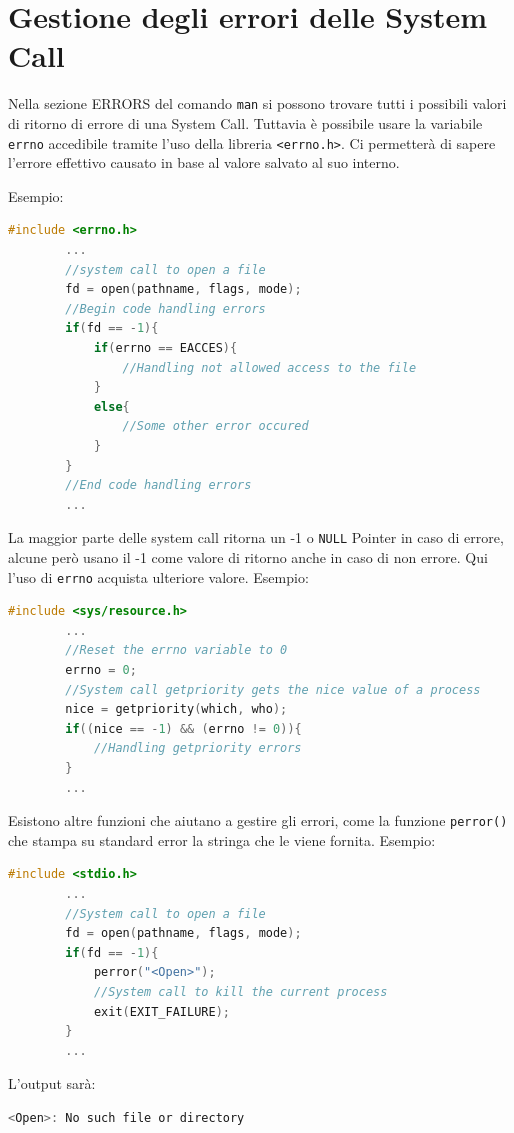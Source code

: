 \documentclass[a4paper, 12pt]{book}
\begin{document}
    \section{Gestione degli errori delle System Call}

    Nella sezione ERRORS del comando \verb|man| si possono trovare
    tutti i possibili valori di ritorno di errore di una 
    System Call. Tuttavia è possibile usare la variabile 
    \verb|errno| accedibile tramite l'uso della libreria
    \verb|<errno.h>|. Ci permetterà di sapere l'errore 
    effettivo causato in base al valore salvato al suo 
    interno.

    Esempio:
    \begin{lstlisting}[language=C]
        #include <errno.h>
        ...
        //system call to open a file
        fd = open(pathname, flags, mode);
        //Begin code handling errors
        if(fd == -1){
            if(errno == EACCES){
                //Handling not allowed access to the file
            }
            else{
                //Some other error occured
            }
        }
        //End code handling errors
        ...
    \end{lstlisting}
    La maggior parte delle system call ritorna un -1 
    o \verb|NULL| Pointer in caso di errore, alcune però 
    usano il -1 come valore di ritorno anche in caso di 
    non errore. Qui l'uso di \verb|errno| acquista 
    ulteriore valore. Esempio:
    \begin{lstlisting}[language=C]
        #include <sys/resource.h>
        ... 
        //Reset the errno variable to 0
        errno = 0;
        //System call getpriority gets the nice value of a process 
        nice = getpriority(which, who);
        if((nice == -1) && (errno != 0)){
            //Handling getpriority errors
        }
        ...        
    \end{lstlisting}
    
    Esistono altre funzioni che aiutano a gestire gli 
    errori, come la funzione \verb|perror()| che stampa 
    su standard error la stringa che le viene fornita.
    Esempio:
    \begin{lstlisting}[language=C]
        #include <stdio.h>
        ... 
        //System call to open a file
        fd = open(pathname, flags, mode);
        if(fd == -1){
            perror("<Open>");
            //System call to kill the current process
            exit(EXIT_FAILURE);
        }
        ...
    \end{lstlisting}
    L'output sarà:
    \begin{lstlisting}[language=C]
        <Open>: No such file or directory
    \end{lstlisting}
    
\end{document}
